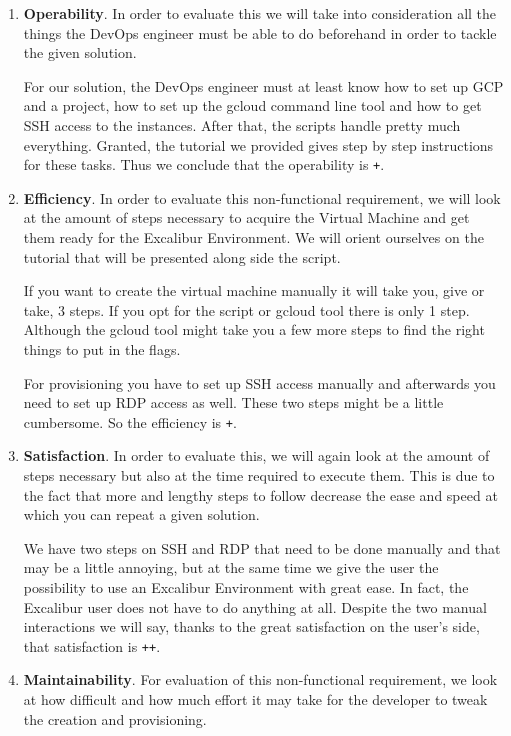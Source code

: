 \begin{enumerate}

	\item \textbf{Operability}.  In order to evaluate
	this we will take into consideration all the things the DevOps
	engineer must be able to do beforehand in order to tackle the
	given solution.

	For our solution, the DevOps engineer must at least know how to
	set up GCP and a project, how to set up the gcloud command line
	tool and how to get SSH access to the instances. After that, the
	scripts handle pretty much everything. Granted, the tutorial we
	provided gives step by step instructions for these tasks. Thus we
	conclude that the operability is \verb|+|.

	\item \textbf{Efficiency}. In order to evaluate
	this non-functional requirement, we will look at the amount of
	steps necessary to acquire the Virtual Machine and get them ready
	for the Excalibur Environment. We will orient ourselves on the
	tutorial that will be presented along side the script.

	If you want to create the virtual machine manually it will take
	you, give or take, 3 steps. If you opt for the script or gcloud
	tool there is only 1 step. Although the gcloud tool might take you
	a few more steps to find the right things to put in the flags.

	For provisioning you have to set up SSH access manually and
	afterwards you need to set up RDP access as well. These two steps
	might be a little cumbersome. So the efficiency is \verb|+|.

	\item \textbf{Satisfaction}.  In order to evaluate
	this, we will again look at the amount of steps necessary but also
	at the time required to execute them.  This is due to the fact
	that more and lengthy steps to follow decrease the ease and speed
	at which you can repeat a given solution.

	We have two steps on SSH and RDP that need to be done manually and
	that may be a little annoying, but at the same time we give the
	user the possibility to use an Excalibur Environment with great
	ease. In fact, the Excalibur user does not have to do anything at
	all. Despite the two manual interactions we will say, thanks to
	the great satisfaction on the user's side, that satisfaction is
	\verb|++|.

	\item \textbf{Maintainability}.  For evaluation of this
	non-functional requirement, we look at how difficult and how much
	effort it may take for the developer to tweak the creation and
	provisioning.


\end{enumerate}

